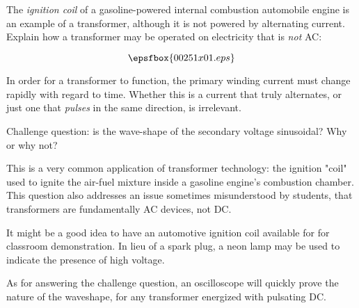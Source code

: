 

The {\it ignition coil} of a gasoline-powered internal combustion automobile engine is an example of a transformer, although it is not powered by alternating current.  Explain how a transformer may be operated on electricity that is {\it not} AC:

$$\epsfbox{00251x01.eps}$$







In order for a transformer to function, the primary winding current must change rapidly with regard to time.  Whether this is a current that truly alternates, or just one that {\it pulses} in the same direction, is irrelevant.

\vskip 10pt

Challenge question: is the wave-shape of the secondary voltage sinusoidal?  Why or why not?







This is a very common application of transformer technology: the ignition "coil" used to ignite the air-fuel mixture inside a gasoline engine's combustion chamber.  This question also addresses an issue sometimes misunderstood by students, that transformers are fundamentally AC devices, not DC.

It might be a good idea to have an automotive ignition coil available for for classroom demonstration.  In lieu of a spark plug, a neon lamp may be used to indicate the presence of high voltage.

As for answering the challenge question, an oscilloscope will quickly prove the nature of the waveshape, for any transformer energized with pulsating DC.





